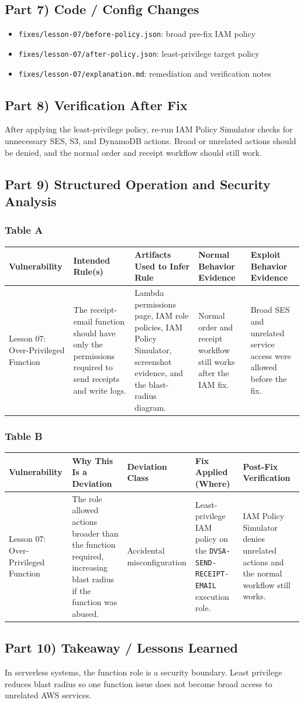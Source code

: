 \documentclass[12pt]{article}
\makeatletter
\newcommand{\analysistables}[9]{
\subsubsection*{Table A}
{\footnotesize
\begin{longtable}{@{}p{0.13\textwidth}p{0.18\textwidth}p{0.17\textwidth}p{0.16\textwidth}p{0.16\textwidth}@{}}
\toprule
Vulnerability & Intended Rule(s) & Artifacts Used to Infer Rule & Normal Behavior Evidence & Exploit Behavior Evidence \\
\midrule
#1 & #2 & #3 & #4 & #5 \\
\bottomrule
\end{longtable}
}

\subsubsection*{Table B}
{\footnotesize
\begin{longtable}{@{}p{0.13\textwidth}p{0.18\textwidth}p{0.13\textwidth}p{0.18\textwidth}p{0.16\textwidth}@{}}
\toprule
Vulnerability & Why This Is a Deviation & Deviation Class & Fix Applied (Where) & Post-Fix Verification \\
\midrule
#1 & #6 & #7 & #8 & #9 \\
\bottomrule
\end{longtable}
}
}
\makeatother
\begin{document}
\subsection*{Part 7) Code / Config Changes}
\begin{itemize}
\item \texttt{fixes/lesson-07/before-policy.json}: broad pre-fix IAM policy
\item \texttt{fixes/lesson-07/after-policy.json}: least-privilege target policy
\item \texttt{fixes/lesson-07/explanation.md}: remediation and verification notes
\end{itemize}

\subsection*{Part 8) Verification After Fix}
After applying the least-privilege policy, re-run IAM Policy Simulator checks for unnecessary SES, S3, and DynamoDB actions. Broad or unrelated actions should be denied, and the normal order and receipt workflow should still work.

\subsection*{Part 9) Structured Operation and Security Analysis}
\analysistables
{Lesson 07: Over-Privileged Function}
{The receipt-email function should have only the permissions required to send receipts and write logs.}
{Lambda permissions page, IAM role policies, IAM Policy Simulator, screenshot evidence, and the blast-radius diagram.}
{Normal order and receipt workflow still works after the IAM fix.}
{Broad SES and unrelated service access were allowed before the fix.}
{The role allowed actions broader than the function required, increasing blast radius if the function was abused.}
{Accidental misconfiguration}
{Least-privilege IAM policy on the \texttt{DVSA-SEND-RECEIPT-EMAIL} execution role.}
{IAM Policy Simulator denies unrelated actions and the normal workflow still works.}

\subsection*{Part 10) Takeaway / Lessons Learned}
In serverless systems, the function role is a security boundary. Least privilege reduces blast radius so one function issue does not become broad access to unrelated AWS services.
\end{document}
